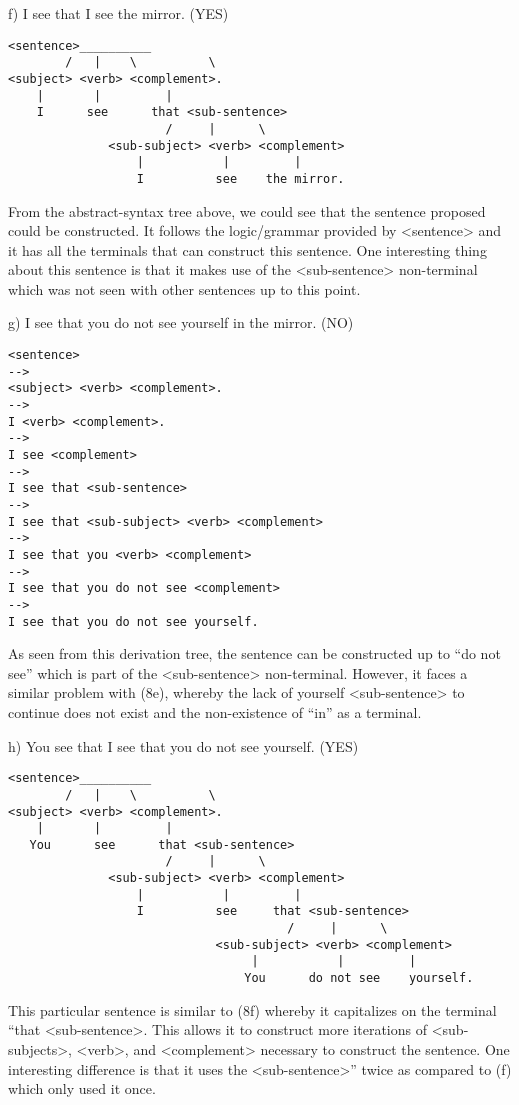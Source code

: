 \documentclass{article}
\begin{document}
\begin{alphabetize}
\item f)	I see that I see the mirror. (YES) 
\begin{lstlisting}
<sentence>__________
        /   |    \          \
<subject> <verb> <complement>.
    |       |         |
    I      see      that <sub-sentence>
                      /     |      \
              <sub-subject> <verb> <complement>
                  |           |         |
                  I          see    the mirror.
\end{lstlisting} \linebreak
From the abstract-syntax tree above, we could see that the sentence proposed could be constructed. It follows the logic/grammar provided by <sentence> and it has all the terminals that can construct this sentence. One interesting thing about this sentence is that it makes use of the <sub-sentence> non-terminal which was not seen with other sentences up to this point. \linebreak
\item g)	I see that you do not see yourself in the mirror. (NO) 
\begin{lstlisting}
<sentence> 
-->  
<subject> <verb> <complement>.
--> 
I <verb> <complement>.
--> 
I see <complement>
--> 
I see that <sub-sentence> 
-->
I see that <sub-subject> <verb> <complement>
-->
I see that you <verb> <complement>
-->
I see that you do not see <complement>
-->
I see that you do not see yourself.
\end{lstlisting} \linebreak

As seen from this derivation tree, the sentence can be constructed up to “do not see” which is part of the <sub-sentence> non-terminal. However, it faces a similar problem with (8e), whereby the lack of yourself <sub-sentence> to continue does not exist and the non-existence of “in” as a terminal. \linebreak

\item h)	You see that I see that you do not see yourself. (YES) 
\begin{lstlisting}
<sentence>__________
        /   |    \          \
<subject> <verb> <complement>.
    |       |         |
   You      see      that <sub-sentence>
                      /     |      \
              <sub-subject> <verb> <complement>
                  |           |         |
                  I          see     that <sub-sentence>
                                       /     |      \
                             <sub-subject> <verb> <complement>
                                  |           |         |
                                 You      do not see    yourself.
\end{lstlisting} \linebreak
This particular sentence is similar to (8f) whereby it capitalizes on the terminal “that <sub-sentence>. This allows it to construct more iterations of <sub-subjects>, <verb>, and <complement> necessary to construct the sentence. One interesting difference is that it uses the <sub-sentence>” twice as compared to (f) which only used it once. \linebreak


\end{alphabetize}
\end{document}

